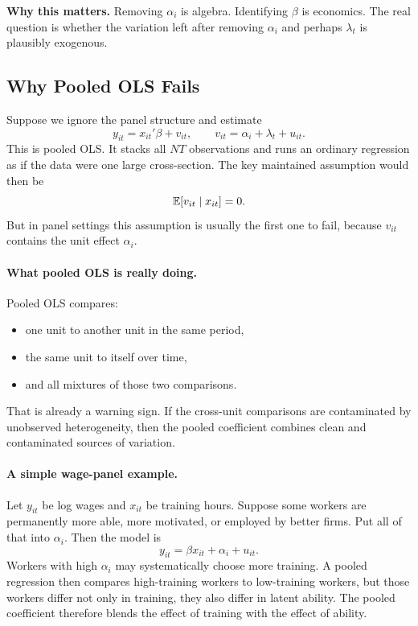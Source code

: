 \begin{boxD}
\textbf{Why this matters.}
Removing $\alpha_i$ is algebra. Identifying $\beta$ is economics. The real question is whether the variation left after removing $\alpha_i$ and perhaps $\lambda_t$ is plausibly exogenous.
\end{boxD}

\subsection{Why Pooled OLS Fails}
Suppose we ignore the panel structure and estimate
\begin{equation}
y_{it} = x_{it}'\beta + v_{it},
\qquad
v_{it} = \alpha_i + \lambda_t + u_{it}.
\label{eq:pooled}
\end{equation}
This is pooled \ac{OLS}. It stacks all $NT$ observations and runs an ordinary regression as if the data were one large cross-section. The key maintained assumption would then be
\[
\mathbb{E}[v_{it}\mid x_{it}] = 0.
\]
But in panel settings this assumption is usually the first one to fail, because $v_{it}$ contains the unit effect $\alpha_i$.

\paragraph{What pooled \ac{OLS} is really doing.}
Pooled \ac{OLS} compares:
\begin{itemize}
\item one unit to another unit in the same period,
\item the same unit to itself over time,
\item and all mixtures of those two comparisons.
\end{itemize}
That is already a warning sign. If the cross-unit comparisons are contaminated by unobserved heterogeneity, then the pooled coefficient combines clean and contaminated sources of variation.

\paragraph{A simple wage-panel example.}
Let $y_{it}$ be log wages and $x_{it}$ be training hours. Suppose some workers are permanently more able, more motivated, or employed by better firms. Put all of that into $\alpha_i$. Then the model is
\[
y_{it} = \beta x_{it} + \alpha_i + u_{it}.
\]
Workers with high $\alpha_i$ may systematically choose more training. A pooled regression then compares high-training workers to low-training workers, but those workers differ not only in training, they also differ in latent ability. The pooled coefficient therefore blends the effect of training with the effect of ability.

